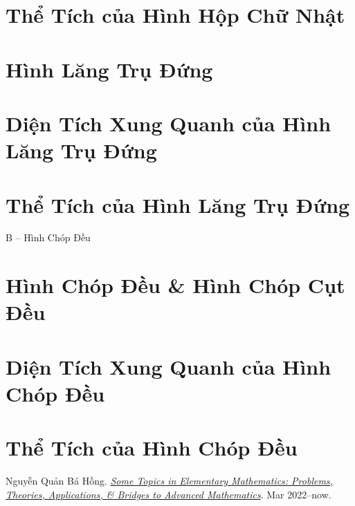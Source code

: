 \documentclass[oneside]{book}
\numberwithin{equation}{section}
\begin{document}
\section{Thể Tích của Hình Hộp Chữ Nhật}

\section{Hình Lăng Trụ Đứng}

\section{Diện Tích Xung Quanh của Hình Lăng Trụ Đứng}

\section{Thể Tích của Hình Lăng Trụ Đứng}

\begin{center}
	\Large B -- Hình Chóp Đều
\end{center}

\section{Hình Chóp Đều \& Hình Chóp Cụt Đều}

\section{Diện Tích Xung Quanh của Hình Chóp Đều}

\section{Thể Tích của Hình Chóp Đều}


\begin{thebibliography}{99}
	 Nguyễn Quản Bá Hồng. \href{https://github.com/NQBH/hobby/blob/master/elementary_mathematics/NQBH_elementary_mathematics.pdf}{\textit{Some Topics in Elementary Mathematics: Problems, Theories, Applications, \textit{\&} Bridges to Advanced Mathematics}}. Mar 2022--now.
\end{thebibliography}


\printbibliography[heading=bibintoc]
	
\end{document}
